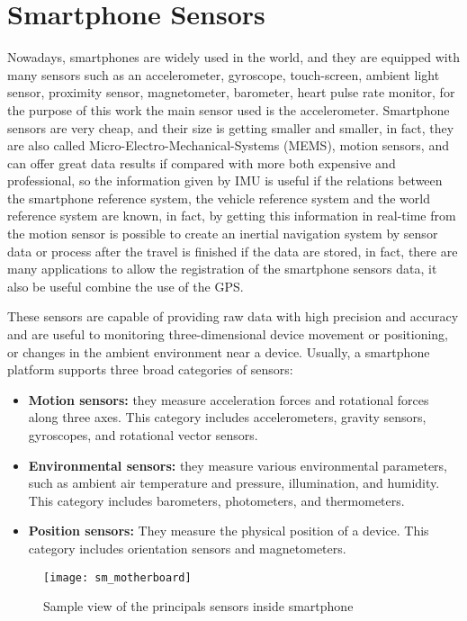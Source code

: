 \documentclass[tesi]{subfiles}
\begin{document}
\section{Smartphone Sensors}\label{sc:Smartphone Sensors}
Nowadays, smartphones are widely used in the world, and they are equipped with many sensors such as an accelerometer, gyroscope, touch-screen, ambient light sensor, proximity sensor, magnetometer, barometer, heart pulse rate monitor, for the purpose of this work the main sensor used is the accelerometer. Smartphone sensors are very cheap, and their size is getting smaller and smaller, in fact, they are also called Micro-Electro-Mechanical-Systems (MEMS), motion sensors, and can offer great data results if compared with more both expensive and professional, so the information given by IMU is useful if the relations between the smartphone reference system, the vehicle reference system and the world reference system are known, in fact, by getting this information in real-time from the motion sensor is possible to create an inertial navigation system by sensor data or process after the travel is finished if the data are stored, in fact, there are many applications to allow the registration of the smartphone sensors data, it also be useful combine the use of the GPS.

These sensors are capable of providing raw data with high precision and accuracy and are useful to monitoring three-dimensional device movement or positioning, or changes in the ambient environment near a device.
Usually, a smartphone platform supports three broad categories of sensors\cite{Andro}:
\begin{itemize}
	\item \textbf{Motion sensors:} they measure acceleration forces and rotational forces along three axes. This category includes accelerometers, gravity sensors, gyroscopes, and rotational vector sensors.
	\item \textbf{Environmental sensors:} they measure various environmental parameters, such as ambient air temperature and pressure, illumination, and humidity. This category includes barometers, photometers, and thermometers.
	\item \textbf{Position sensors:} They measure the physical position of a device. This category includes orientation sensors and magnetometers.
\end{itemize}

\vspace{1cm}
\begin{figure}[H]
\centering
\texttt{[image: sm\_motherboard]}
\caption{Sample view of the principals sensors inside smartphone}
\label{fig:Sample smartphone sensors}
\end{figure}
\end{document}
